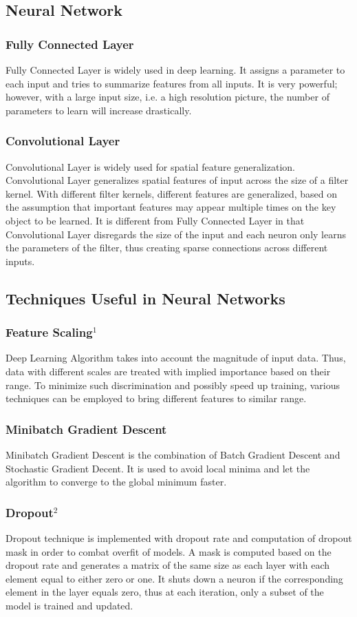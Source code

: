 \documentclass[twocolumn, 12pt]{article}
\begin{document}
\subsection{Neural Network}
\subsubsection*{Fully Connected Layer}
Fully Connected Layer is widely used in deep learning. It assigns a parameter to each input and tries to summarize features from all inputs. It is very powerful; however, with a large input size, i.e. a high resolution picture, the number of parameters to learn will increase drastically. 
\subsubsection*{Convolutional Layer}
Convolutional Layer is widely used for spatial feature generalization. Convolutional Layer generalizes spatial features of input across the size of a filter kernel. With different filter kernels, different features are generalized, based on the assumption that important features may appear multiple times on the key object to be learned. It is different from Fully Connected Layer in that Convolutional Layer disregards the size of the input and each neuron only learns the parameters of the filter, thus creating sparse connections across different inputs. 
\subsection{Techniques Useful in Neural Networks}
\subsubsection{Feature Scaling$^1$}
Deep Learning Algorithm takes into account the magnitude of input data. Thus, data with different scales are treated with implied importance based on their range. To minimize such discrimination and possibly speed up training, various techniques can be employed to bring different features to similar range.
\subsubsection*{Minibatch Gradient Descent}
Minibatch Gradient Descent is the combination of Batch Gradient Descent and Stochastic Gradient Decent. It is used to avoid local minima and let the algorithm to converge to the global minimum faster.
\subsubsection*{Dropout$^2$}
Dropout technique is implemented with dropout rate and computation of dropout mask in order to combat overfit of models. A mask is computed based on the dropout rate and generates a matrix of the same size as each layer with each element equal to either zero or one. It shuts down a neuron if the corresponding element in the layer equals zero, thus at each iteration, only a subset of the model is trained and updated.
\end{document}
